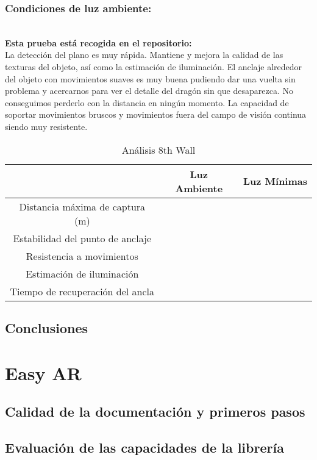 \subsubsection{Condiciones de luz ambiente:}\\
\textbf{Esta prueba está recogida en el repositorio:}\\

La detección del plano es muy rápida. Mantiene y mejora la calidad de las texturas del objeto, así como la estimación de iluminación. El anclaje alrededor del objeto con movimientos suaves es muy buena pudiendo dar una vuelta sin problema y acercarnos para ver el detalle del dragón sin que desaparezca. No conseguimos perderlo con la distancia en ningún momento. La capacidad de soportar movimientos bruscos y movimientos fuera del campo de visión continua siendo muy resistente.

\begin{table}[H]
    \centering
    \begin{tabular}{|c|c|c|}
    \hline
          & Luz Ambiente & Luz Mínimas \\
         \hline
        Distancia máxima de captura (m)  & &\\
        \hline
        Estabilidad del punto de anclaje  & &\\
        \hline
        Resistencia a movimientos  & & \\
        \hline
        Estimación de iluminación  & & \\
        \hline
        Tiempo de recuperación del ancla  & & \\
      \hline
    \end{tabular}
    \caption{Análisis 8th Wall}
    \label{tab:TMaxst}
\end{table}
\subsection{Conclusiones}

\clearpage
\section{Easy AR}
\subsection{Calidad de la documentación y primeros pasos}

\subsection{Evaluación de las capacidades de la librería}
